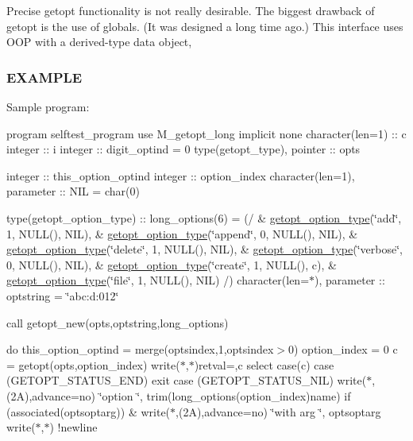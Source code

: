 Precise getopt functionality is not really desirable. The biggest drawback of getopt is the use of globals. (It was designed a long time ago.) This interface uses O\+OP with a derived-\/type data object, \subsubsection*{E\+X\+A\+M\+P\+LE}

Sample program\+:

program selftest\+\_\+program use M\+\_\+getopt\+\_\+long implicit none character(len=1) \+:\+: c integer \+:\+: i integer \+:\+: digit\+\_\+optind = 0 type(getopt\+\_\+type), pointer \+:\+: opts

integer \+:\+: this\+\_\+option\+\_\+optind integer \+:\+: option\+\_\+index character(len=1), parameter \+:\+: N\+IL = char(0)

type(getopt\+\_\+option\+\_\+type) \+:\+: long\+\_\+options(6) = (/ \& \hyperlink{structm__getopt__long_1_1getopt__option__type}{getopt\+\_\+option\+\_\+type}(\char`\"{}add\char`\"{}, 1, N\+U\+L\+L(), N\+IL), \& \hyperlink{structm__getopt__long_1_1getopt__option__type}{getopt\+\_\+option\+\_\+type}(\char`\"{}append\char`\"{}, 0, N\+U\+L\+L(), N\+IL), \& \hyperlink{structm__getopt__long_1_1getopt__option__type}{getopt\+\_\+option\+\_\+type}(\char`\"{}delete\char`\"{}, 1, N\+U\+L\+L(), N\+IL), \& \hyperlink{structm__getopt__long_1_1getopt__option__type}{getopt\+\_\+option\+\_\+type}(\char`\"{}verbose\char`\"{}, 0, N\+U\+L\+L(), N\+IL), \& \hyperlink{structm__getopt__long_1_1getopt__option__type}{getopt\+\_\+option\+\_\+type}(\char`\"{}create\char`\"{}, 1, N\+U\+L\+L(), \textquotesingle{}c\textquotesingle{}), \& \hyperlink{structm__getopt__long_1_1getopt__option__type}{getopt\+\_\+option\+\_\+type}(\char`\"{}file\char`\"{}, 1, N\+U\+L\+L(), N\+IL) /) character(len=$\ast$), parameter \+:\+: optstring = \char`\"{}abc\+:d\+:012\char`\"{}

call getopt\+\_\+new(opts,optstring,long\+\_\+options)

do this\+\_\+option\+\_\+optind = merge(optsindex,1,optsindex$>$0) option\+\_\+index = 0 c = getopt(opts,option\+\_\+index) write($\ast$,$\ast$)\textquotesingle{}retval=\textquotesingle{},c select case(c) case (G\+E\+T\+O\+P\+T\+\_\+\+S\+T\+A\+T\+U\+S\+\_\+\+E\+ND) exit case (G\+E\+T\+O\+P\+T\+\_\+\+S\+T\+A\+T\+U\+S\+\_\+\+N\+IL) write($\ast$,\textquotesingle{}(2A)\textquotesingle{},advance=\textquotesingle{}no\textquotesingle{}) \char`\"{}option \char`\"{}, trim(long\+\_\+options(option\+\_\+index)name) if (associated(optsoptarg)) \& write($\ast$,\textquotesingle{}(2A)\textquotesingle{},advance=\textquotesingle{}no\textquotesingle{}) \char`\"{}with arg \char`\"{}, optsoptarg write($\ast$,$\ast$) !newline

